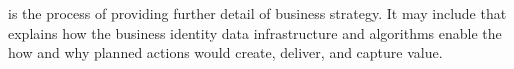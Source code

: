 %
%
\textbf{}
is the process of providing further detail of business strategy.
It may include  that explains how the business identity
data infrastructure and algorithms enable the how and why planned actions
would create, deliver, and capture value.

